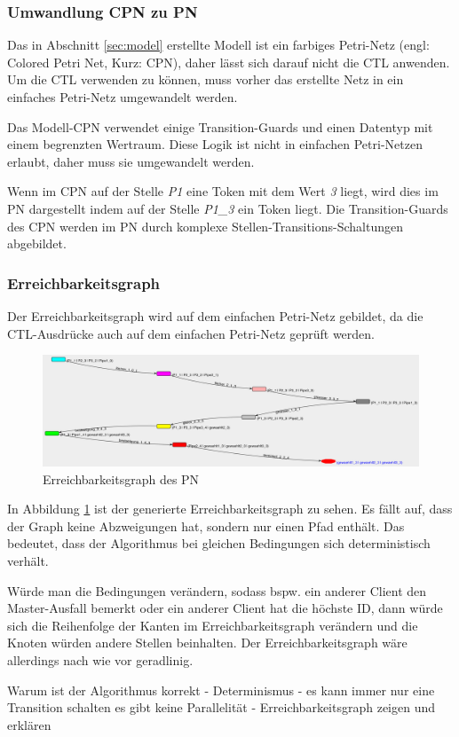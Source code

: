 \subsubsection{Umwandlung CPN zu PN}
Das in Abschnitt \ref{sec:model} erstellte Modell ist ein farbiges Petri-Netz (engl: Colored Petri Net, Kurz: CPN), daher lässt sich darauf nicht die CTL anwenden. Um die CTL verwenden zu können, muss vorher das erstellte Netz in ein einfaches Petri-Netz umgewandelt werden.

Das Modell-CPN verwendet einige Transition-Guards und einen Datentyp mit einem begrenzten Wertraum. Diese Logik ist nicht in einfachen Petri-Netzen erlaubt, daher muss sie umgewandelt werden.

Wenn im CPN auf der Stelle \textit{P1} eine Token mit dem Wert \textit{3} liegt, wird dies im PN dargestellt indem auf der Stelle \textit{P1\_3} ein Token liegt. Die Transition-Guards des CPN werden im PN durch komplexe Stellen-Transitions-Schaltungen abgebildet.

\subsubsection{Erreichbarkeitsgraph}
Der Erreichbarkeitsgraph wird auf dem einfachen Petri-Netz gebildet, da die CTL-Ausdrücke auch auf dem einfachen Petri-Netz geprüft werden.

\begin{figure}[H]
\centering
\includegraphics[width=1\linewidth]{reachibility_graph}
\caption{Erreichbarkeitsgraph des PN}
\label{fig:reachibility_graph}
\end{figure}

In Abbildung \ref{fig:reachibility_graph} ist der generierte Erreichbarkeitsgraph zu sehen. Es fällt auf, dass der Graph keine Abzweigungen hat, sondern nur einen Pfad enthält. Das bedeutet, dass der Algorithmus bei gleichen Bedingungen sich deterministisch verhält.

Würde man die Bedingungen verändern, sodass bspw. ein anderer Client den Master-Ausfall bemerkt oder ein anderer Client hat die höchste ID, dann würde sich die Reihenfolge der Kanten im Erreichbarkeitsgraph verändern und die Knoten würden andere Stellen beinhalten. Der Erreichbarkeitsgraph wäre allerdings nach wie vor geradlinig.


Warum ist der Algorithmus korrekt
- Determinismus
- es kann immer nur eine Transition schalten es gibt keine Parallelität
- Erreichbarkeitsgraph zeigen und erklären
